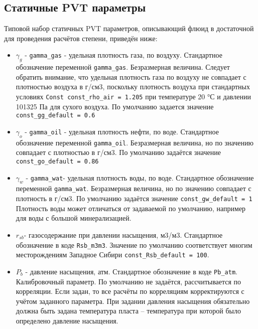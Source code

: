 \subsection{Статичные PVT параметры}
Типовой  набор статичных PVT параметров, описывающий флюид в достаточной для проведения расчётов степени, приведён ниже:


\begin{itemize}
	
\item	$\gamma_g$  - \texttt{gamma_gas} - удельная плотность газа, по воздуху. Стандартное обозначение переменной \texttt{gamma_gas}. Безразмерная величина. Следует обратить внимание, что удельная плотность газа по воздуху не совпадает с плотностью воздуха в г/см3, поскольку плотность воздуха при стандартных условиях \texttt{Const const_rho_air = 1.205} при температуре 20 °С и давлении 101325 Па для сухого воздуха. По умолчанию задается значение \texttt{const_gg_default = 0.6}

\item $\gamma_o$  - \texttt{gamma_oil} - удельная плотность нефти, по воде. Стандартное обозначение переменной \texttt{gamma_oil}. Безразмерная величина, но по значению совпадает с плотностью в г/см3. По умолчанию задаётся значение \texttt{const_go_default = 0.86}

\item $\gamma_w$  - \texttt{gamma_wat}- удельная плотность воды, по воде. Стандартное обозначение переменной \texttt{gamma_wat}. Безразмерная величина, но по значению совпадает с плотность в г/см3. По умолчанию задаётся значение \texttt{const_gw_default = 1} Плотность воды может отличаться от задаваемой по умолчанию, например для воды с большой минерализацией.  

\item $r_{sb}$- газосодержание при давлении насыщения, м3/м3. Стандартное обозначение в коде \texttt{Rsb_m3m3}. Значение по умолчанию соответствует многим месторождениям Западное Сибири \texttt{const_Rsb_default = 100}.

\item $P_b$ - давление насыщения, атм. Стандартное обозначение в коде \texttt{Pb_atm}. Калибровочный параметр. По умолчанию не задаётся, рассчитывается по корреляции. Если задан, то все расчёты по корреляциям корректируются с учётом заданного параметра. При задании давления насыщения обязательно должна быть задана температура пласта – температура при которой было определено давление насыщения. 


\end{itemize}
